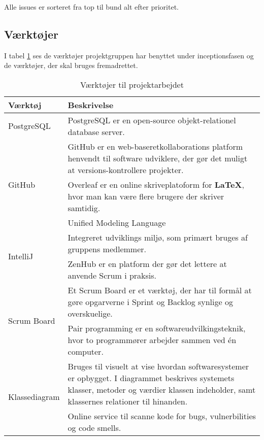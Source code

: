 Alle issues er sorteret fra top til bund alt efter prioritet. \\

\newpage
\subsection{Værktøjer}
I tabel \ref{tab:tools} ses de værktøjer projektgruppen har benyttet under inceptionsfasen og de værktøjer, der skal bruges fremadrettet.
\begin{table}[ht]
    \begin{tabularx}{\textwidth}{|p{4cm}|X|}
        \hline
        \textbf{Værktøj} & \textbf{Beskrivelse} \\
        \hline
        PostgreSQL          &   PostgreSQL er en open-source objekt-relationel database server.\\
        \hline
        \multirow{3}{*}{GitHub}              &   GitHub er en web-baseretkollaborations platform henvendt til software udviklere, der gør det muligt at versions-kontrollere projekter.\\ 
        \hline
        \multirow{2}{*}{Overleaf}            &   Overleaf er en online skriveplatoform for \textbf{LaTeX}, hvor man kan være flere brugere der skriver samtidig. \\
        \hline
        UML                 &   Unified Modeling Language \\
        \hline
        \multirow{2}{*}{IntelliJ}            &   Integreret udviklings miljø, som primært bruges af gruppens medlemmer. \\
        \hline
        \multirow{2}{*}{ZenHub}              &   ZenHub er en platform der gør det lettere at anvende Scrum i praksis.  \\
        \hline
        \multirow{2}{*}{Scrum Board}         &   Et Scrum Board er et værktøj, der har til formål at gøre opgarverne i Sprint og Backlog synlige og overskuelige.\\
        \hline
        \multirow{2}{*}{Pair Programming}    &   Pair programming er en softwareudvilkingsteknik, hvor to programmører arbejder sammen ved én computer.\\
        \hline
        \multirow{3}{*}{Klassediagram}       &   Bruges til visuelt at vise hvordan softwaresystemer er opbygget. I diagrammet beskrives systemets klasser, metoder og værdier klassen indeholder, samt klassernes relationer til hinanden.\\
        \hline
        SonarCloud          &   Online service til scanne kode for bugs, vulnerbilities og code smells.\\
        \hline
    \end{tabularx}
    \caption{Værktøjer til projektarbejdet}
    \label{tab:tools}
\end{table}